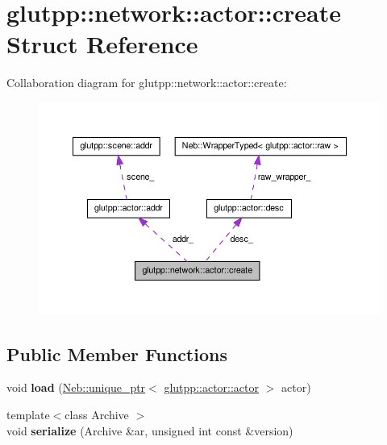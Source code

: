 \hypertarget{structglutpp_1_1network_1_1actor_1_1create}{\section{glutpp\-:\-:network\-:\-:actor\-:\-:create \-Struct \-Reference}
\label{structglutpp_1_1network_1_1actor_1_1create}
}


\-Collaboration diagram for glutpp\-:\-:network\-:\-:actor\-:\-:create\-:\nopagebreak
\begin{figure}[H]
\begin{center}
\leavevmode
\includegraphics[width=350pt]{structglutpp_1_1network_1_1actor_1_1create__coll__graph}
\end{center}
\end{figure}
\subsection*{\-Public \-Member \-Functions}
\begin{DoxyCompactItemize}
\item 
\hypertarget{structglutpp_1_1network_1_1actor_1_1create_accc621699dd1fd80af572dda0caf64cf}{void {\bfseries load} (\hyperlink{classNeb_1_1unique__ptr}{\-Neb\-::unique\-\_\-ptr}$<$ \hyperlink{classglutpp_1_1actor_1_1actor}{glutpp\-::actor\-::actor} $>$ actor)}\label{structglutpp_1_1network_1_1actor_1_1create_accc621699dd1fd80af572dda0caf64cf}

\item 
\hypertarget{structglutpp_1_1network_1_1actor_1_1create_aad9dd37d1bfd140b16db4576e2e0cf95}{{\footnotesize template$<$class Archive $>$ }\\void {\bfseries serialize} (\-Archive \&ar, unsigned int const \&version)}\label{structglutpp_1_1network_1_1actor_1_1create_aad9dd37d1bfd140b16db4576e2e0cf95}

\end{DoxyCompactItemize}
